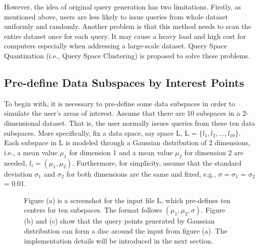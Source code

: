 \documentclass{lmproj}
\begin{document}
However, the idea of original query generation has two limitations. Firstly, as mentioned above, users are less likely to issue queries from whole dataset uniformly and randomly. Another problem is that this method needs to scan the entire dataset once for each query. It may cause a heavy load and high cost for computers especially when addressing a large-scale dataset. Query Space Quantization (i.e., Query Space Clustering) is proposed to solve these problems. 

\subsection{Pre-define Data Subspaces by Interest Points}
To begin with, it is necessary to pre-define some data subspaces in order to simulate the user's areas of interest. Assume that there are 10 subspaces in a 2-dimensional dataset. That is, the user normally issues queries from these ten data subspaces. More specifically, fix a data space, say space L, L = $ \{l_1,l_2, ..., l_{10}\} $. Each subspace in L is modeled through a Gaussian distribution of 2 dimensions, i.e., a mean value $ \mu_1 $ for dimension 1 and a mean value $ \mu_2 $  for dimension 2 are needed, $ l_i= (\mu_1,\mu_2) $. Furthermore, for simplicity, assume that the standard deviation  $ \sigma_1 $  and $ \sigma_2 $ for both dimensions are the same and fixed, e.g., $ \sigma = \sigma_1 $ = $ \sigma_2 $ = 0.01. 

\begin{figure}

Figure (a) is a screenshot for the input file L, which pre-defines ten centers for ten subspaces. The format follows $ (\mu_1,\mu_2,\sigma) $. Figure (b) and (c) show that the query points generated by Gaussian distribution can form a disc around the input from figure (a). The implementation details will be introduced in the next section.
\end{figure}
\end{document}
